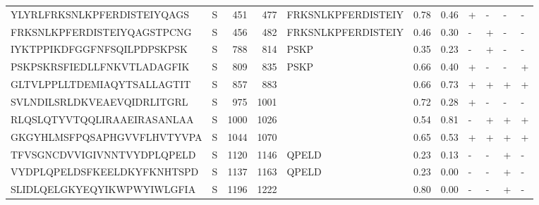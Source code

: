 \begin{tabular}{llrrlrrllll}
YLYRLFRKSNLKPFERDISTEIYQAGS &       S &    451 &   477 &  FRKSNLKPFERDISTEIY &            0.78 &             0.46 &      + &       - &      - &       - \\
FRKSNLKPFERDISTEIYQAGSTPCNG &       S &    456 &   482 &  FRKSNLKPFERDISTEIY &            0.46 &             0.30 &      - &       + &      - &       - \\
IYKTPPIKDFGGFNFSQILPDPSKPSK &       S &    788 &   814 &                PSKP &            0.35 &             0.23 &      - &       + &      - &       - \\
PSKPSKRSFIEDLLFNKVTLADAGFIK &       S &    809 &   835 &                PSKP &            0.66 &             0.40 &      + &       - &      - &       + \\
GLTVLPPLLTDEMIAQYTSALLAGTIT &       S &    857 &   883 &                     &            0.66 &             0.73 &      + &       + &      + &       + \\
SVLNDILSRLDKVEAEVQIDRLITGRL &       S &    975 &  1001 &                     &            0.72 &             0.28 &      + &       - &      - &       - \\
RLQSLQTYVTQQLIRAAEIRASANLAA &       S &   1000 &  1026 &                     &            0.54 &             0.81 &      - &       + &      + &       + \\
GKGYHLMSFPQSAPHGVVFLHVTYVPA &       S &   1044 &  1070 &                     &            0.65 &             0.53 &      + &       + &      + &       + \\
TFVSGNCDVVIGIVNNTVYDPLQPELD &       S &   1120 &  1146 &               QPELD &            0.23 &             0.13 &      - &       - &      + &       - \\
VYDPLQPELDSFKEELDKYFKNHTSPD &       S &   1137 &  1163 &               QPELD &            0.23 &             0.00 &      - &       - &      + &       - \\
SLIDLQELGKYEQYIKWPWYIWLGFIA &       S &   1196 &  1222 &                     &            0.80 &             0.00 &      - &       - &      + &       - \\
\bottomrule
\end{tabular}
